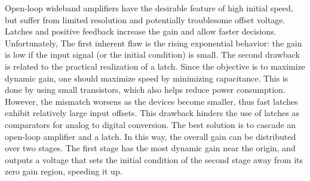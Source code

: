 


Open-loop wideband amplifiers have the desirable feature of high initial speed, but suffer from limited resolution and potentially troublesome offset voltage. Latches and positive feedback increase the gain and allow faster decisions. Unfortunately, The first inherent flaw is the rising exponential behavior: the gain is low if the input signal (or the initial condition) is small.
The second drawback is related to the practical realization of a latch. Since the objective is to maximize dynamic gain, one should maximize speed by minimizing capacitance. This is done by using small transistors, which also helps reduce power consumption. However, the mismatch worsens as the devices become smaller, thus fast latches exhibit relatively large input offsets. This drawback hinders the use of latches as comparators for analog to digital conversion.
The best solution is to cascade an open-loop amplifier and a latch. In this way, the overall gain can be distributed over two stages. The first stage has the most dynamic gain near the origin, and outputs a voltage that sets the initial condition of the second stage away from its zero gain region, speeding it up.

